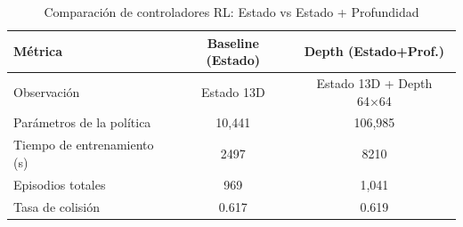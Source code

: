 \begin{table}[h]
\centering
\caption{Comparación de controladores RL: Estado vs Estado + Profundidad}
\label{tab:rl_comparison}
\begin{tabular}{lcc}
\toprule
\textbf{Métrica} & \textbf{Baseline (Estado)} & \textbf{Depth (Estado+Prof.)} \\
\midrule
Observación & Estado 13D & Estado 13D + Depth 64×64 \\
Parámetros de la política & 10,441 & 106,985 \\
Tiempo de entrenamiento (s) & 2497 & 8210 \\
Episodios totales & 969 & 1,041 \\
Tasa de colisión & 0.617 & 0.619 \\
\bottomrule
\end{tabular}
\end{table}
